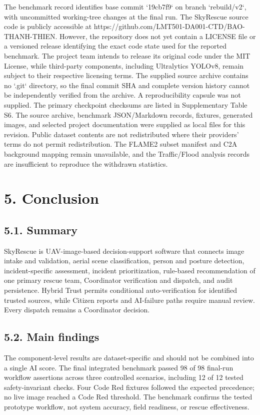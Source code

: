 \documentclass[pdflatex,sn-mathphys-ay]{sn-jnl}
\begin{document}
The benchmark record identifies base commit `19cb7f9` on branch `rebuild/v2`, with uncommitted working-tree changes at the final run. The SkyRescue source code is publicly accessible at https://github.com/LMT501-DA001-CTD/BAO-THANH-THIEN. However, the repository does not yet contain a LICENSE file or a versioned release identifying the exact code state used for the reported benchmark. The project team intends to release its original code under the MIT License, while third-party components, including Ultralytics YOLOv8, remain subject to their respective licensing terms. The supplied source archive contains no `.git` directory, so the final commit SHA and complete version history cannot be independently verified from the archive. A reproducibility capsule was not supplied. The primary checkpoint checksums are listed in Supplementary Table S6. The source archive, benchmark JSON/Markdown records, fixtures, generated images, and selected project documentation were supplied as local files for this revision. Public dataset contents are not redistributed where their providers' terms do not permit redistribution. The FLAME2 subset manifest and C2A background mapping remain unavailable, and the Traffic/Flood analysis records are insufficient to reproduce the withdrawn statistics.

\section*{5. Conclusion}

\subsection*{5.1. Summary}

SkyRescue is UAV-image-based decision-support software that connects image intake and validation, aerial scene classification, person and posture detection, incident-specific assessment, incident prioritization, rule-based recommendation of one primary rescue team, Coordinator verification and dispatch, and audit persistence. Hybrid Trust permits conditional auto-verification for identified trusted sources, while Citizen reports and AI-failure paths require manual review. Every dispatch remains a Coordinator decision.

\subsection*{5.2. Main findings}

The component-level results are dataset-specific and should not be combined into a single AI score. The final integrated benchmark passed 98 of 98 final-run workflow assertions across three controlled scenarios, including 12 of 12 tested safety-invariant checks. Four Code Red fixtures followed the expected precedence; no live image reached a Code Red threshold. The benchmark confirms the tested prototype workflow, not system accuracy, field readiness, or rescue effectiveness.
\end{document}
